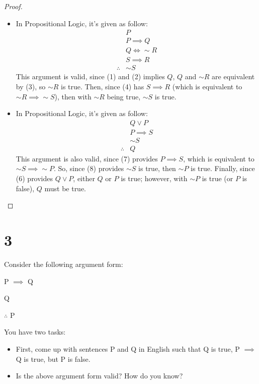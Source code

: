 \documentclass{article}
\begin{document}
\begin{proof}
    
    \hfill

    \begin{itemize}
        \item[a)] In Propositional Logic, it's given as follow:
        \begin{align}
            &P\\
            &P\implies Q\\
            &Q\iff \sim R\\
            &S\implies R\\
            \therefore &\sim S
        \end{align}
        This argument is valid, since (1) and (2) implies $Q$, $Q$ and $\sim R$ are equivalent by (3), so $\sim R$ is true. Then, since (4) has $S\implies R$ (which is equivalent to $\sim R\implies \sim S$), then with $\sim R$ being true, $\sim S$ is true.

        \hfill

        \item[b)] In Propositional Logic, it's given as follow:
        \begin{align}
            &Q \vee P\\
            & P\implies S\\
            &\sim S\\
            \therefore & Q
        \end{align}
        This argument is also valid, since (7) provides $P\implies S$, which is equivalent to $\sim S\implies \sim P$. So, since (8) provides $\sim S$ is true, then $\sim P$ is true. Finally, since (6) provides $Q\vee P$, either $Q$ or $P$ is true; however, with $\sim P$ is true (or $P$ is false), $Q$ must be true.
    \end{itemize}
\end{proof}

\hfill

\section*{3}
\begin{ques}\label{q3}
Consider the following argument form:

P $\implies$ Q

Q

$\therefore$ P

You have two tasks:
\begin{itemize}
    \item[a)]First, come up with sentences P and Q in English such that Q is true, P $\implies$ Q is true, but P is false.
    \item[b)] Is the above argument form valid? How do you know?
\end{itemize}
\end{ques}
\end{document}
